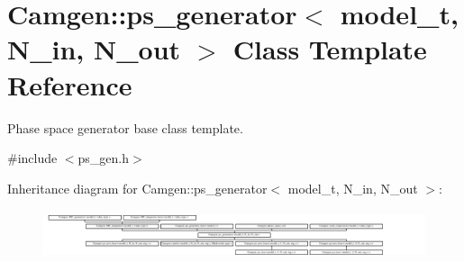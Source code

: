 \hypertarget{a00450}{}\section{Camgen\+:\+:ps\+\_\+generator$<$ model\+\_\+t, N\+\_\+in, N\+\_\+out $>$ Class Template Reference}
\label{a00450}


Phase space generator base class template.  




{\ttfamily \#include $<$ps\+\_\+gen.\+h$>$}

Inheritance diagram for Camgen\+:\+:ps\+\_\+generator$<$ model\+\_\+t, N\+\_\+in, N\+\_\+out $>$\+:\begin{figure}[H]
\begin{center}
\leavevmode
\includegraphics[height=1.447028cm]{a00450}
\end{center}
\end{figure}

